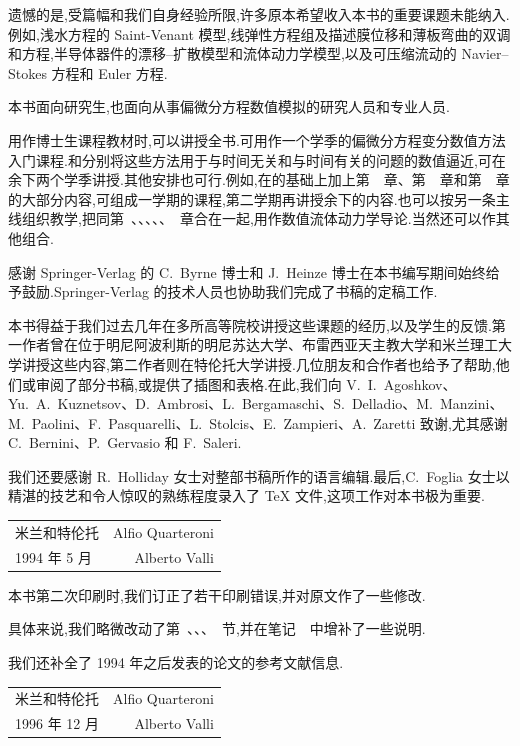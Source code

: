 遗憾的是,受篇幅和我们自身经验所限,许多原本希望收入本书的重要课题未能纳入.例如,浅水方程的 Saint-Venant 模型,线弹性方程组及描述膜位移和薄板弯曲的双调和方程,半导体器件的漂移--扩散模型和流体动力学模型,以及可压缩流动的 Navier--Stokes 方程和 Euler 方程.

本书面向研究生,也面向从事偏微分方程数值模拟的研究人员和专业人员.

用作博士生课程教材时,可以讲授全书.可用作一个学季的偏微分方程变分数值方法入门课程.和分别将这些方法用于与时间无关和与时间有关的问题的数值逼近,可在余下两个学季讲授.其他安排也可行.例如,在的基础上加上第~~章、第~~章和第~~章的大部分内容,可组成一学期的课程,第二学期再讲授余下的内容.也可以按另一条主线组织教学,把同第~、、、、、~章合在一起,用作数值流体动力学导论.当然还可以作其他组合.

感谢 Springer-Verlag 的 C.~Byrne 博士和 J.~Heinze 博士在本书编写期间始终给予鼓励.Springer-Verlag 的技术人员也协助我们完成了书稿的定稿工作.

本书得益于我们过去几年在多所高等院校讲授这些课题的经历,以及学生的反馈.第一作者曾在位于明尼阿波利斯的明尼苏达大学、布雷西亚天主教大学和米兰理工大学讲授这些内容,第二作者则在特伦托大学讲授.几位朋友和合作者也给予了帮助,他们或审阅了部分书稿,或提供了插图和表格.在此,我们向 V.~I.~Agoshkov、Yu.~A.~Kuznetsov、D.~Ambrosi、L.~Bergamaschi、S.~Delladio、M.~Manzini、M.~Paolini、F.~Pasquarelli、L.~Stolcis、E.~Zampieri、A.~Zaretti 致谢,尤其感谢 C.~Bernini、P.~Gervasio 和 F.~Saleri.

我们还要感谢 R.~Holliday 女士对整部书稿所作的语言编辑.最后,C.~Foglia 女士以精湛的技艺和令人惊叹的熟练程度录入了 \TeX{} 文件,这项工作对本书极为重要.

\noindent
\begin{tabular*}{\linewidth}{@{}l@{\extracolsep{\fill}}r@{}}
米兰和特伦托 & Alfio Quarteroni\\
1994 年 5 月 & Alberto Valli
\end{tabular*}

\bigskip
本书第二次印刷时,我们订正了若干印刷错误,并对原文作了一些修改.

具体来说,我们略微改动了第~、、、~节,并在笔记~~中增补了一些说明.

我们还补全了 1994 年之后发表的论文的参考文献信息.

\noindent
\begin{tabular*}{\linewidth}{@{}l@{\extracolsep{\fill}}r@{}}
米兰和特伦托 & Alfio Quarteroni\\
1996 年 12 月 & Alberto Valli
\end{tabular*}
